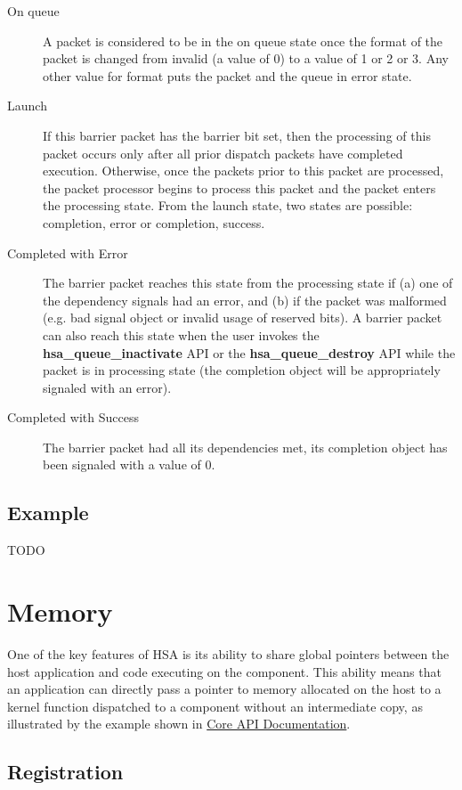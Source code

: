 \documentclass[draft]{book}
\newcommand{\reffun}[1]{\textbf{#1}}
\begin{document}
\begin{description}
\item[On queue] A packet is considered to be in the on queue state once
  the format of the packet is changed from invalid (a value of 0) to a value of
  1 or 2 or 3. Any other value for format puts the packet and the queue in error
  state.
\item[Launch] If this barrier packet has the barrier bit set, then the
  processing of this packet occurs only after all prior dispatch packets have
  completed execution. Otherwise, once the packets prior to this packet are
  processed, the packet processor begins to process this packet and the packet
  enters the processing state. From the launch state, two states are possible:
  completion, error or completion, success.
\item[Completed with Error] The barrier packet reaches this state from the
  processing state if (a) one of the dependency signals had an error, and (b) if
  the packet was malformed (e.g. bad signal object or invalid usage of reserved
  bits). A barrier packet can also reach this state when the user invokes the
  \reffun{hsa_queue_inactivate} API or the \reffun{hsa_queue_destroy} API while
  the packet is in processing state (the completion object will be appropriately
  signaled with an error).
\item[Completed with Success] The barrier packet had all its dependencies met,
  its completion object has been signaled with a value of 0.
\end{description}

\hypertarget{aql-example}{}\subsection{Example}\label{aql-example}
TODO

\section{Memory}\label{memory}\hypertarget{memory}{}

One of the key features of HSA is its ability to share global pointers between
the host application and code executing on the component. This ability means
that an application can directly pass a pointer to memory allocated on the host
to a kernel function dispatched to a component without an intermediate copy, as
illustrated by the example shown in \hyperlink{coreapi}{Core API Documentation}.

\hypertarget{memory-registration}{}\subsection{Registration}\label{memory-registration}
\end{document}
